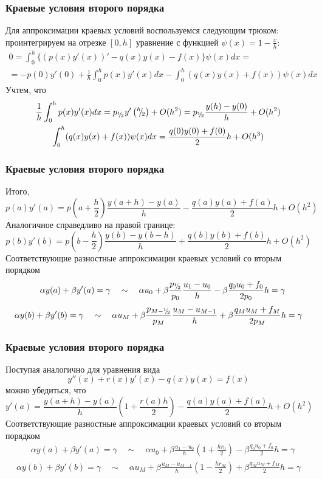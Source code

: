 \documentclass[professionalfonts,compress,unicode,aspectratio=169]{beamer}
\newcommand{\cutefrac}[2]{{}^{#1}\mkern-5mu/{\!}_#2}
\newcommand{\half}{{\cutefrac{1}{2}}}
\begin{document}
\begin{frame}\frametitle{Краевые условия второго порядка}
	Для аппроксимации краевых условий воспользуемся следующим трюком:
	проинтегрируем на отрезке $[0, h]$ уравнение с функцией $\psi(x) = 1 - \frac{x}{h}$:
	\begin{multline*}
	0 = \int_0^h \Big\{(p(x)y'(x))' -q(x)y(x) - f(x)\Big\}\psi(x) dx = \\
	 = -p(0)y'(0) + \frac{1}{h} \int_0^h p(x)y'(x) dx
	 - \int_0^h (q(x)y(x) + f(x))\psi(x) dx
	\end{multline*}
	Учтем, что
	\begin{gather*}
	\frac{1}{h}\int_0^h p(x) y'(x) dx = 
	p_{\half}
	y'\left(\cutefrac{h}{2}\right) + O(h^2) = 
	p_{\half}
	\frac{y(h) - y(0)}{h} + O(h^2)\\
	 \int_0^h (q(x)y(x) + f(x))\psi(x) dx = \frac{q(0) y(0) + f(0)}{2}h + O(h^3)
	\end{gather*}
\end{frame}

\begin{frame}\frametitle{Краевые условия второго порядка}
	Итого,
	\[
	p(a)y'(a) = p\left(a + \frac{h}{2}\right) \frac{y(a + h) - y(a)}{h} 
	- \frac{q(a)y(a) + f(a)}{2}h + O(h^2)
	\]
	Аналогичное справедливо на правой границе:
	\[
	p(b)y'(b) = p\left(b - \frac{h}{2}\right) \frac{y(b) - y(b - h)}{h}
	+ \frac{q(b)y(b) + f(b)}{2}h + O(h^2)
	\]
	Соответствующие разностные аппроксимации краевых условий со вторым порядком
	\begin{gather*}
	\quad \alpha y(a) + \beta y'(a) = \gamma \quad \sim \quad \alpha u_0 + \beta
	\frac{p_{\half}}{p_0} \frac{u_1 - u_0}{h} - \beta \frac{q_0 u_0 +
	f_0}{2p_0}h = \gamma
	\end{gather*}
	\begin{multline*}
	\alpha y(b) + \beta y'(b) = \gamma \quad \sim \quad \alpha u_M + \beta 
	\frac{p_{M-\half}}{p_M} \frac{u_M - u_{M-1}}{h} + \beta\frac{q_M u_M +
	f_M}{2p_M}h = \gamma
	\end{multline*}
\end{frame}

\begin{frame}\frametitle{Краевые условия второго порядка}
	Поступая аналогично для уравнения вида
	\[
	y''(x) + r(x) y'(x) - q(x) y(x) = f(x)
	\]
	можно убедиться, что
	\[
	y'(a) = \frac{y(a + h) - y(a)}{h} \left(1 + \frac{r(a)h}{2}\right)
	- \frac{q(a)y(a) + f(a)}{2}h + O(h^2)
	\]
	Соответствующие разностные аппроксимации краевых условий со вторым порядком
	\begin{multline*}
	\quad \alpha y(a) + \beta y'(a) = \gamma
	\quad \sim \quad
	\alpha u_0 + \beta
	\frac{u_1 - u_0}{h}\left(1 + \frac{h r_0}{2}\right) - \beta \frac{q_0 u_0 +
	f_0}{2}h = \gamma
	\end{multline*}
	\begin{multline*}
	\alpha y(b) + \beta y'(b) = \gamma
	\quad \sim \quad \alpha u_M + \beta 
	\frac{u_M - u_{M-1}}{h}\left(1 - \frac{hr_M}{2}\right) + \beta\frac{q_M u_M +
	f_M}{2}h = \gamma
	\end{multline*}
\end{frame}
\end{document}
